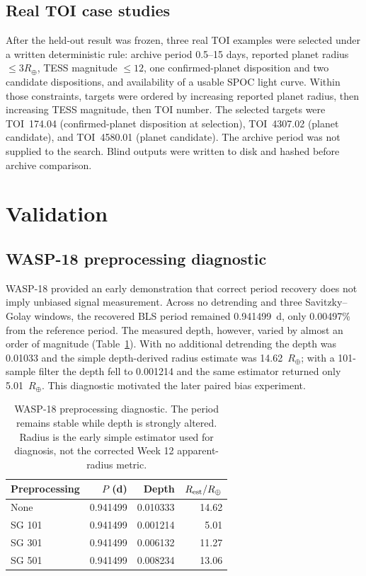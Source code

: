 \documentclass[11pt]{article}
\begin{document}
\subsection{Real TOI case studies}
After the held-out result was frozen, three real TOI examples were selected under a written deterministic rule: archive period 0.5--15 days, reported planet radius $\leq3R_\oplus$, TESS magnitude $\leq12$, one confirmed-planet disposition and two candidate dispositions, and availability of a usable SPOC light curve. Within those constraints, targets were ordered by increasing reported planet radius, then increasing TESS magnitude, then TOI number. The selected targets were TOI~174.04 (confirmed-planet disposition at selection), TOI~4307.02 (planet candidate), and TOI~4580.01 (planet candidate). The archive period was not supplied to the search. Blind outputs were written to disk and hashed before archive comparison.

\section{Validation}
\subsection{WASP-18 preprocessing diagnostic}
WASP-18 provided an early demonstration that correct period recovery does not imply unbiased signal measurement. Across no detrending and three Savitzky--Golay windows, the recovered BLS period remained 0.941499~d, only 0.00497\% from the reference period. The measured depth, however, varied by almost an order of magnitude (Table~\ref{tab:wasp18diag}). With no additional detrending the depth was 0.01033 and the simple depth-derived radius estimate was 14.62~$R_\oplus$; with a 101-sample filter the depth fell to 0.001214 and the same estimator returned only 5.01~$R_\oplus$. This diagnostic motivated the later paired bias experiment.

\begin{table}[htbp]
\centering
\caption{WASP-18 preprocessing diagnostic. The period remains stable while depth is strongly altered. Radius is the early simple estimator used for diagnosis, not the corrected Week 12 apparent-radius metric.}
\label{tab:wasp18diag}
\small
\begin{tabular}{lrrr}
\toprule
Preprocessing & $P$ (d) & Depth & $R_{\rm est}/R_\oplus$\\
\midrule
None      & 0.941499 & 0.010333 & 14.62\\
SG 101    & 0.941499 & 0.001214 & 5.01\\
SG 301    & 0.941499 & 0.006132 & 11.27\\
SG 501    & 0.941499 & 0.008234 & 13.06\\
\bottomrule
\end{tabular}
\end{table}
\end{document}
